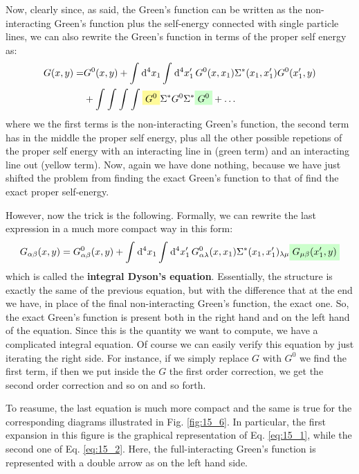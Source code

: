 \documentclass[../main/main.tex]{subfiles}
\begin{document}
Now, clearly since, as said, the Green's function can be written as the non-interacting Green's function plus the self-energy connected with single particle lines, we can also rewrite the Green's function in terms of the proper self energy as:
\begin{equation}
\begin{split}
    G(x,y) = & G^0 (x,y)
    + \int_{}^{} \dd[4]{x_1} \int_{}^{} \dd[4]{x_1'} G^0 (x,x_1) \Sigma ^* (x_1,x_1') G^0 (x_1',y) \\
    &+ \int_{}^{} \int_{}^{} \int_{}^{} \int_{}^{} \mathcolorbox{yellow!40}{G^0} \Sigma ^* G^0 \Sigma ^* \mathcolorbox{green!20}{G^0} + \dots
\end{split}
\label{eq:15_1}
\end{equation}
where we the first terms is the non-interacting Green's function, the second term has in the middle the proper self energy, plus all the other possible repetions of the proper self energy with an interacting line in (green term) and an interacting line out (yellow term).
Now, again we have done nothing, because we have just shifted the problem from finding the exact Green's function to that of find the exact proper self-energy.


However, now the trick is the following. Formally, we can rewrite the last expression in a much more compact way in this form:
\begin{equation}
  G_{\alpha \beta } (x,y) = G^0 _{\alpha \beta } (x,y)
  + \int_{}^{} \dd[4]{x_1}  \int_{}^{} \dd[4]{x_1'} G^0_{\alpha \lambda } (x,x_1) \Sigma ^* (x_1,x_1')_{\lambda  \mu } \mathcolorbox{green!20}{G_{\mu \beta } (x_1',y)}
  \label{eq:15_2}
\end{equation}
which is called the \textbf{integral Dyson's equation}. Essentially, the structure is exactly the same of the previous equation, but with the difference that at the end we have, in place of the final non-interacting Green's function, the exact one. So, the exact Green's function is present both in the right hand and on the left hand of the equation.
Since this is the quantity we want to compute, we have a complicated integral equation. Of course we can easily verify this equation by just iterating the right side. For instance, if we simply replace \( G \) with  \( G^0 \) we find the first term, if then we put inside the \(G\) the first order correction, we get the second order correction and so on and so forth.

To reasume, the last equation is much more compact and the same is true for the corresponding diagrams illustrated in Fig. \ref{fig:15_6}. In particular, the first expansion in this figure is the graphical representation of Eq. \eqref{eq:15_1}, while the second one of Eq. \eqref{eq:15_2}. Here, the full-interacting Green's function is represented with a double arrow as on the left hand side.
\end{document}
